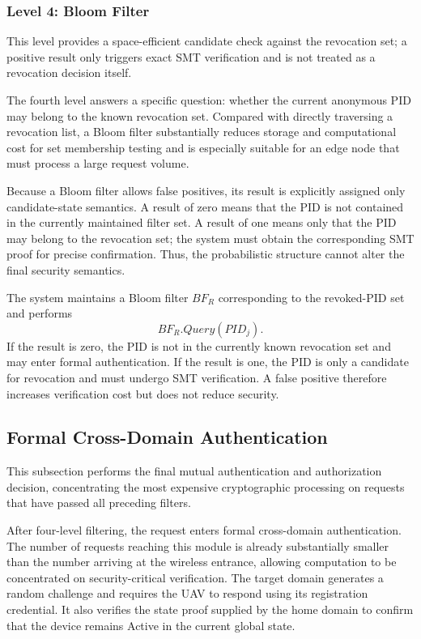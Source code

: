 \documentclass[lettersize,journal]{IEEEtran}
\begin{document}
	\subsubsection{Level 4: Bloom Filter}
	This level provides a space-efficient candidate check against the revocation set; a positive result only triggers exact SMT verification and is not treated as a revocation decision itself.
	
	
	The fourth level answers a specific question: whether the current anonymous PID may belong to the known revocation set. Compared with directly traversing a revocation list, a Bloom filter substantially reduces storage and computational cost for set membership testing and is especially suitable for an edge node that must process a large request volume.
	
	Because a Bloom filter allows false positives, its result is explicitly assigned only candidate-state semantics. A result of zero means that the PID is not contained in the currently maintained filter set. A result of one means only that the PID may belong to the revocation set; the system must obtain the corresponding SMT proof for precise confirmation. Thus, the probabilistic structure cannot alter the final security semantics.
	
	The system maintains a Bloom filter $BF_R$ corresponding to the revoked-PID set and performs
	\begin{equation}
		BF_R.Query(PID_j).
	\end{equation}
	If the result is zero, the PID is not in the currently known revocation set and may enter formal authentication. If the result is one, the PID is only a candidate for revocation and must undergo SMT verification. A false positive therefore increases verification cost but does not reduce security.
	
	\subsection{Formal Cross-Domain Authentication}
	This subsection performs the final mutual authentication and authorization decision, concentrating the most expensive cryptographic processing on requests that have passed all preceding filters.
	
	
	After four-level filtering, the request enters formal cross-domain authentication. The number of requests reaching this module is already substantially smaller than the number arriving at the wireless entrance, allowing computation to be concentrated on security-critical verification. The target domain generates a random challenge and requires the UAV to respond using its registration credential. It also verifies the state proof supplied by the home domain to confirm that the device remains Active in the current global state.
	
\end{document}
